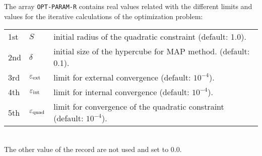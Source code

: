 \vspace{0.1cm}

The array {\tt OPT-PARAM-R} contains real values related with the different limits and values for the iterative calculations of the optimization problem: \\
\begin{tabular}{p{}p{}p{}}
1st & $S$ & initial radius of the quadratic constraint (default: 1.0).\\
2nd & $\delta$ & initial size of the hypercube for MAP method. (default: 0.1).\\
3rd & $\varepsilon_{\rm ext}$ & limit for external convergence (default: $10^{-4}$).\\
4th & $\varepsilon_{\rm int}$ & limit for internal convergence (default: $10^{-4}$).\\
5th & $\varepsilon_{\rm quad}$ & limit for convergence of the quadratic constraint (default: $10^{-4}$). \\
\end{tabular} \\
The other value of the record are not used and set to 0.0.

\vskip 0.2cm


